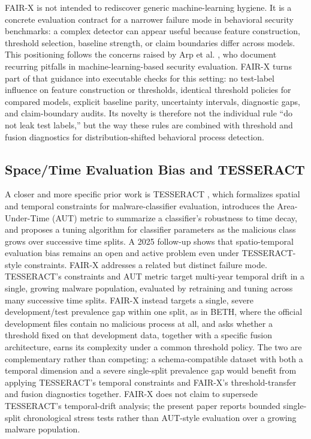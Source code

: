 \documentclass[10pt,journal,compsoc]{IEEEtran}
\begin{document}
FAIR-X is not intended to rediscover generic machine-learning hygiene. It is a concrete evaluation contract for a narrower failure mode in behavioral security benchmarks: a complex detector can appear useful because feature construction, threshold selection, baseline strength, or claim boundaries differ across models. This positioning follows the concerns raised by Arp et al. \cite{arp2022}, who document recurring pitfalls in machine-learning-based security evaluation. FAIR-X turns part of that guidance into executable checks for this setting: no test-label influence on feature construction or thresholds, identical threshold policies for compared models, explicit baseline parity, uncertainty intervals, diagnostic gaps, and claim-boundary audits. Its novelty is therefore not the individual rule ``do not leak test labels,'' but the way these rules are combined with threshold and fusion diagnostics for distribution-shifted behavioral process detection.

\subsection{Space/Time Evaluation Bias and TESSERACT}

A closer and more specific prior work is TESSERACT \cite{pendlebury2019tesseract,kan2024tesseract}, which formalizes spatial and temporal constraints for malware-classifier evaluation, introduces the Area-Under-Time (AUT) metric to summarize a classifier's robustness to time decay, and proposes a tuning algorithm for classifier parameters as the malicious class grows over successive time splits. A 2025 follow-up \cite{chow2025breaking} shows that spatio-temporal evaluation bias remains an open and active problem even under TESSERACT-style constraints. FAIR-X addresses a related but distinct failure mode. TESSERACT's constraints and AUT metric target multi-year temporal drift in a single, growing malware population, evaluated by retraining and tuning across many successive time splits. FAIR-X instead targets a single, severe development/test prevalence gap within one split, as in BETH, where the official development files contain no malicious process at all, and asks whether a threshold fixed on that development data, together with a specific fusion architecture, earns its complexity under a common threshold policy. The two are complementary rather than competing: a schema-compatible dataset with both a temporal dimension and a severe single-split prevalence gap would benefit from applying TESSERACT's temporal constraints and FAIR-X's threshold-transfer and fusion diagnostics together. FAIR-X does not claim to supersede TESSERACT's temporal-drift analysis; the present paper reports bounded single-split chronological stress tests rather than AUT-style evaluation over a growing malware population.
\end{document}
